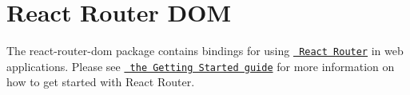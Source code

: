 \chapter{React Router DOM}
\hypertarget{md__2home_2solype_2delivery_2current__days_2Mannheim_2front_2node__modules_2react-router-dom_2README}{}\label{md__2home_2solype_2delivery_2current__days_2Mannheim_2front_2node__modules_2react-router-dom_2README}
\label{md__2home_2solype_2delivery_2current__days_2Mannheim_2front_2node__modules_2react-router-dom_2README_autotoc_md5350}%
%
 The {\ttfamily react-\/router-\/dom} package contains bindings for using \href{https://github.com/remix-run/react-router}{\texttt{ React Router}} in web applications. Please see \href{https://reactrouter.com/en/main/start/tutorial}{\texttt{ the Getting Started guide}} for more information on how to get started with React Router. 